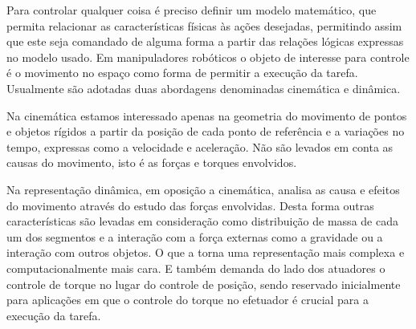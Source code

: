 Para controlar qualquer coisa é preciso definir um modelo matemático, que permita relacionar as características físicas às ações desejadas, permitindo assim que este seja comandado de alguma forma a partir das relações lógicas expressas no modelo usado. Em manipuladores robóticos o objeto de interesse para controle é o movimento no espaço como forma de permitir a execução da tarefa. Usualmente são adotadas duas abordagens denominadas cinemática e dinâmica.

Na cinemática estamos interessado apenas na geometria do movimento de pontos e objetos rígidos a partir da posição de cada ponto de referência e a variações no tempo, expressas como a velocidade e aceleração. Não são levados em conta as causas do movimento, isto é as forças e torques envolvidos.


Na representação dinâmica, em oposição a cinemática, analisa as causa e efeitos do movimento através do estudo das forças envolvidas. Desta forma outras características são levadas em consideração como distribuição de massa de cada um dos segmentos e a interação com a força externas como a gravidade ou a interação com outros objetos. O que a torna uma representação mais complexa e computacionalmente mais cara. E também demanda do lado dos atuadores o controle de torque no lugar do controle de posição, sendo reservado inicialmente para aplicações em que o controle do torque no efetuador é crucial para a execução da tarefa.




